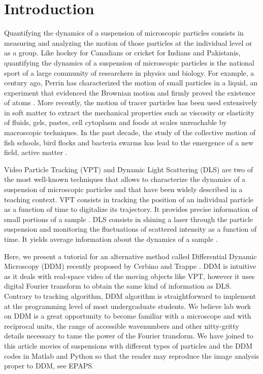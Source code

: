 \documentclass[prb,reprint,amsmath,amssymb]{revtex4-1}
\begin{document}
\section{\label{sec:level1}Introduction}

Quantifying the dynamics of a suspension of microscopic particles consists in measuring and analyzing the motion of those particles at the individual level or as a group. Like hockey for Canadians or cricket for Indians and Pakistanis, quantifying the dynamics of a suspension of microscopic particles is the national sport of a large community of researchers in physics and biology. For example, a century ago, Perrin has characterized the motion of small particles in a liquid, an experiment that evidenced the Brownian motion and firmly proved the existence of atoms \cite{22_perrin2014atomes}. More recently, the motion of tracer particles has been used extensively in soft matter\cite{pt1990witten, pt1964reiner} to extract the mechanical properties such as viscosity or elasticity of fluids, gels\cite{Mason1997, Chen2010}, pastes, cell cytoplasm\cite{Fabry2001,Lau2003} and foods at scales unreachable by macroscopic techniques. In the past decade, the study of the collective motion of fish schools, bird flocks and bacteria swarms has lead to the emergence of a new field, active matter \cite{Bricard2013}.

Video Particle Tracking (VPT) and Dynamic Light Scattering (DLS) are two of the most well-known techniques that allows to characterize the dynamics of a suspension of microscopic particles and that have been widely described in a teaching context. VPT consists in tracking the position of an individual particle as a function of time to digitalize its trajectory. It provides precise information of small portions of a sample \citep{Crocker1996,ajp2013catipovic,Maurer2014}. DLS consists in shining a laser through the particle suspension and monitoring the fluctuations of scattered intensity as a function of time\cite{ajp1969clark}. It yields average information about the dynamics of a sample \citep{18_sartor2003dynamic, ajp1999goldburg,ajp1969clark}.

Here, we present a tutorial for an alternative method called Differential Dynamic Microscopy (DDM) recently proposed by Cerbino and Trappe \cite{2_DDM}. DDM is intuitive as it deals with real-space video of the moving objects like VPT, however it uses digital Fourier transform to obtain the same kind of information as DLS.  Contrary to tracking algorithm, DDM algorithm is straightforward to implement at the programming level of most undergraduate students. We believe lab work on DDM is a great opportunity to become familiar with a microscope and with reciprocal units, the range of accessible wavenumbers and other nitty-gritty details necessary to tame the power of the Fourier transform\cite{ajp1976higgins, ajp2001whiford}. We have joined to this article movies of suspensions with different types of particles and the DDM codes in Matlab and Python so that the reader may reproduce the image analysis proper to DDM, see EPAPS.
\end{document}
